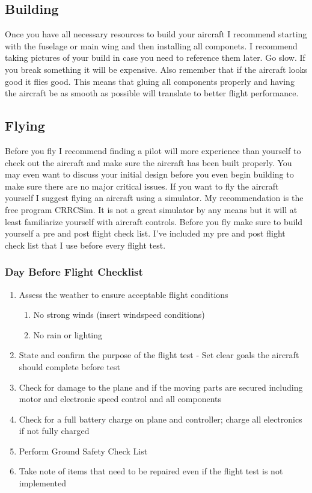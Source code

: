 \documentclass{article}
\begin{document}
\subsection{Building}

Once you have all necessary resources to build your aircraft I
recommend starting with the fuselage or main wing and then installing
all componets. I recommend taking pictures of your build in case you
need to reference them later. Go slow. If you break something it will
be expensive. Also remember that if the aircraft looks good it flies
good. This means that gluing all components properly and having the
aircraft be as smooth as possible will translate to better flight
performance. 

\subsection{Flying}

Before you fly I recommend finding a pilot will more experience than
yourself to check out the aircraft and make sure the aircraft has been
built properly. You may even want to discuss your initial design
before you even begin building to make sure there are no major
critical issues. If you want to fly the aircraft yourself I suggest
flying an aircraft using a simulator. My recommendation is the free
program CRRCSim\cite{CRRCSim}. It is not a great simulator by any means but it will
at least familiarize yourself with aircraft controls. Before you fly
make sure to build yourself a pre and post flight check list. I've
included my pre and post flight check list that I use before every
flight test.

\subsubsection{Day Before Flight Checklist}
\begin{enumerate}[itemsep=-5pt]
\item Assess the weather to ensure acceptable flight conditions
  \begin{enumerate}[itemsep=-5pt]
    \item No strong winds (insert windspeed conditions)
    \item No rain or lighting
  \end{enumerate}
\item State and confirm the purpose of the flight test - Set clear
  goals the aircraft should complete before test 
\item Check for damage to the plane and if the moving parts are secured including motor and electronic speed control and all components
\item Check for a full battery charge on plane and controller; charge
  all electronics if not fully charged
\item Perform Ground Safety Check List
\item Take note of items that need to be repaired even if the flight test is not implemented
\end{enumerate}
\end{document}
